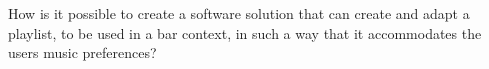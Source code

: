 How is it possible to create a software solution that can create and adapt a playlist, to be used in a bar context, in such a way that it accommodates the users music preferences?
